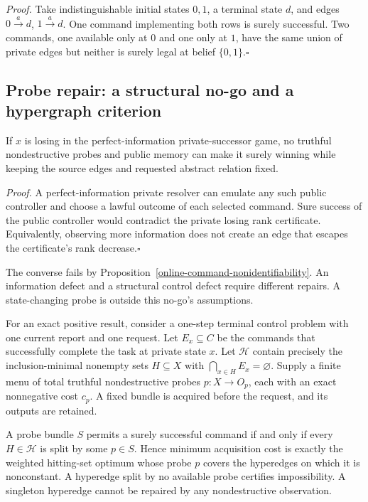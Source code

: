 \emph{Proof.}
Take indistinguishable initial states $0,1$, a terminal state $d$, and edges
$0\xrightarrow a d$, $1\xrightarrow a d$. One command implementing both rows
is surely successful. Two commands, one available only at $0$ and one only
at $1$, have the same union of private edges but neither is surely legal at
belief $\{0,1\}$.\hfill$\square$

\subsection{Probe repair: a structural no-go and a hypergraph criterion}
\label{online-probe-repair}

\begin{proposition}
\label{online-structural-no-go}
If $x$ is losing in the perfect-information private-successor game, no truthful
nondestructive probes and public memory can make it surely winning while
keeping the source edges and requested abstract relation fixed.
\end{proposition}

\emph{Proof.}
A perfect-information private resolver can emulate any such public controller
and choose a lawful outcome of each selected command. Sure success of the
public controller would contradict the private losing rank certificate.
Equivalently, observing more information does not create an edge that escapes
the certificate's rank decrease.\hfill$\square$

The converse fails by Proposition~\ref{online-command-nonidentifiability}.
An information defect and a structural control defect require different
repairs. A state-changing probe is outside this no-go's assumptions.

For an exact positive result, consider a one-step terminal control problem
with one current report and one request. Let $E_x\subseteq C$ be the commands
that successfully complete the task at private state $x$. Let $\mathcal H$
contain precisely the inclusion-minimal nonempty sets $H\subseteq X$ with
$\bigcap_{x\in H}E_x=\varnothing$. Supply a finite menu of total truthful
nondestructive probes $p:X\to O_p$, each with an exact nonnegative cost $c_p$.
A fixed bundle is acquired before the request, and its outputs are retained.

\begin{theorem}
\label{online-probe-hitting}
A probe bundle $S$ permits a surely successful command if and only if every
$H\in\mathcal H$ is split by some $p\in S$. Hence minimum acquisition cost
is exactly the weighted hitting-set optimum whose probe $p$ covers the
hyperedges on which it is nonconstant. A hyperedge split by no available
probe certifies impossibility. A singleton hyperedge cannot be repaired by
any nondestructive observation.
\end{theorem}

